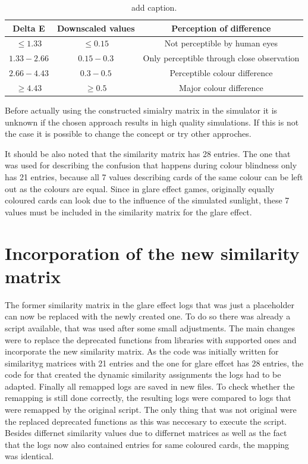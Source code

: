 \begin{table}[H]
	\centering
	\caption{add caption.}%
	\begin{tabular}{|c|c|c|}
		\hline
		Delta E & Downscaled values & Perception of difference \\
		\hline
		$\leq1.33$ & $\leq0.15$ & Not perceptible by human eyes\\
		$1.33-2.66$ &$0.15-0.3$  & Only perceptible through close observation \\
		$2.66-4.43$ & $0.3-0.5$ & Perceptible colour difference \\
		$\geq4.43$ &$\geq0.5$  & Major colour difference\\
		\hline
	\end{tabular}
\end{table}
Before actually using the constructed simialry matrix in the simulator it is unknown if the chosen approach results in high quality simulations. If this is not the case it is possible to change the concept or try other approches. 

It should be also noted that the similarity matrix has 28 entries. The one that was used for describing the confusion that happens during colour blindness only has 21 entries, because all 7 values describing cards of the same colour can be left out as the colours are equal. Since in glare effect games, originally equally coloured cards can look due to the influence of the simulated sunlight, these 7 values must be included in the similarity matrix for the glare effect.

\section{Incorporation of the new similarity matrix}
\label{incorporation_of_the_new_similarity_matrix}
The former similarity matrix in the glare effect logs that was just a placeholder can now be replaced with the newly created one. To do so there was already a script available, that was used after some small adjustments. The main changes were to replace the deprecated functions from libraries with supported ones and incorporate the new similarity matrix. As the code was initially written for similarityg matrices with 21 entries and the one for glare effcet has 28 entries, the code for that created the dynamic similarity assignments the logs had to be adapted. Finally all remapped logs are saved in new files. To check whether the remapping is still done correctly, the resulting logs were compared to logs that were remapped by the original script. The only thing that was not original were the replaced deprecated functions as this was neccesary to execute the script. Besides differnet similarity values due to differnet matrices as well as the fact that the logs now also contained entries for same coloured cards, the mapping was identical. 

